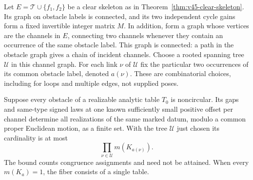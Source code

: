Let $E=\mathcal T\cup\{f_1,f_2\}$ be a clear skeleton as in
Theorem~\ref{thm:v45-clear-skeleton}.  Its graph on obstacle labels is
connected, and its two independent cycle gains form a fixed invertible
integer matrix $M$.  In addition, form a graph whose vertices are the
channels in $E$, connecting two channels whenever they contain an
occurrence of the same obstacle label.  This graph is connected: a
path in the obstacle graph gives a chain of incident channels.
Choose a rooted spanning tree $\mathcal U$ in this channel graph.
For each link $\nu$ of $\mathcal U$ fix the particular two occurrences
of its common obstacle label, denoted $a(\nu)$.  These are combinatorial
choices, including for loops and multiple edges, not supplied poses.

\begin{theorem}
\label{thm:v49-finite-fiber}
Suppose every obstacle of a realizable analytic table $T_0$ is
noncircular.  Its gaps and same-type signed laws at one known sufficiently
small positive offset per channel determine all realizations of the
same marked datum, modulo a common proper Euclidean motion, as a finite
set.  With the tree $\mathcal U$ just chosen its cardinality is at most
\begin{equation}\label{eq:v49-fiber-bound}
                         \prod_{\nu\in\mathcal U}m(K_{a(\nu)}).
\end{equation}
The bound counts congruence assignments and need not be attained.
When every $m(K_a)=1$, the fiber consists of a single table.
\end{theorem}
